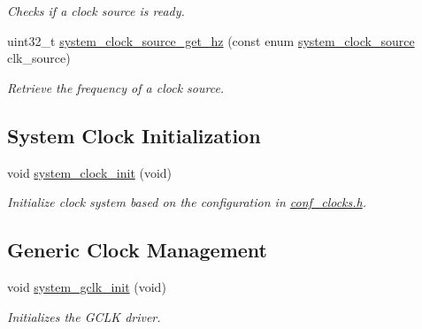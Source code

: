 \begin{DoxyCompactItemize}
\begin{DoxyCompactList}\small\item\em Checks if a clock source is ready. \end{DoxyCompactList}\item 
uint32\+\_\+t \mbox{\hyperlink{group__asfdoc__sam0__system__clock__group_ga1894d901b7ed10e4c1e52a784c8962be}{system\+\_\+clock\+\_\+source\+\_\+get\+\_\+hz}} (const enum \mbox{\hyperlink{group__asfdoc__sam0__system__clock__group_ga86882dc960f2552722e9713da97fcc58}{system\+\_\+clock\+\_\+source}} clk\+\_\+source)
\begin{DoxyCompactList}\small\item\em Retrieve the frequency of a clock source. \end{DoxyCompactList}\end{DoxyCompactItemize}
\subsection*{System Clock Initialization}
\begin{DoxyCompactItemize}
\item 
void \mbox{\hyperlink{group__asfdoc__sam0__system__clock__group_ga128236c1939f726786521434d8488b37}{system\+\_\+clock\+\_\+init}} (void)
\begin{DoxyCompactList}\small\item\em Initialize clock system based on the configuration in \mbox{\hyperlink{conf__clocks_8h}{conf\+\_\+clocks.\+h}}. \end{DoxyCompactList}\end{DoxyCompactItemize}
\subsection*{Generic Clock Management}
\begin{DoxyCompactItemize}
\item 
void \mbox{\hyperlink{group__asfdoc__sam0__system__clock__group_ga2e73072514e6300d60f18039ca47bf09}{system\+\_\+gclk\+\_\+init}} (void)
\begin{DoxyCompactList}\small\item\em Initializes the G\+C\+LK driver. \end{DoxyCompactList}\end{DoxyCompactItemize}
